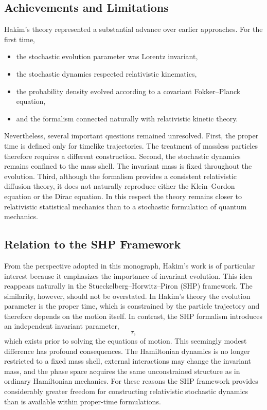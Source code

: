 \subsection{Achievements and Limitations}
Hakim's theory represented a substantial advance over earlier
approaches.
For the first time,
\begin{itemize}
\item the stochastic evolution parameter was Lorentz invariant,
\item the stochastic dynamics respected relativistic kinematics,
\item the probability density evolved according to a covariant
Fokker--Planck equation,
\item and the formalism connected naturally with relativistic kinetic
theory.
\end{itemize}
Nevertheless, several important questions remained unresolved.
First, the proper time is defined only for timelike trajectories.
The treatment of massless particles therefore requires a different
construction.
Second, the stochastic dynamics remains confined to the mass shell.
The invariant mass is fixed throughout the evolution.
Third, although the formalism provides a consistent relativistic
diffusion theory, it does not naturally reproduce either the
Klein--Gordon equation or the Dirac equation.
In this respect the theory remains closer to relativistic statistical
mechanics than to a stochastic formulation of quantum mechanics.
\subsection{Relation to the SHP Framework}
From the perspective adopted in this monograph, Hakim's work is of
particular interest because it emphasizes the importance of invariant
evolution.
This idea reappears naturally in the
Stueckelberg--Horwitz--Piron (SHP) framework.
The similarity, however, should not be overstated.
In Hakim's theory the evolution parameter is the proper time,
which is constrained by the particle trajectory and therefore depends on
the motion itself.
In contrast, the SHP formalism introduces an independent invariant
parameter,
\[\tau,\]
which exists prior to solving the equations of motion.
This seemingly modest difference has profound consequences.
The Hamiltonian dynamics is no longer restricted to a fixed mass shell,
external interactions may change the invariant mass, and the phase space
acquires the same unconstrained structure as in ordinary Hamiltonian
mechanics.
For these reasons the SHP framework provides considerably greater
freedom for constructing relativistic stochastic dynamics than is
available within proper-time formulations.
